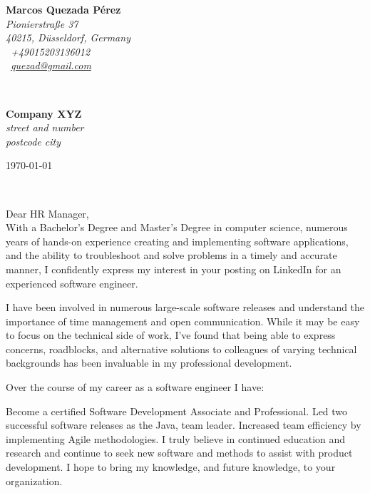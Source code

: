 \documentclass[a4paper,nonstopmode,11pt]{article}
\renewcommand{\sffamily}{\rmfamily}
\begin{document}
\sffamily   %
\hfill%
\begin{minipage}[t]{.6\textwidth}
\raggedleft%
{\bfseries Marcos Quezada Pérez}\\[.35ex]
\small\itshape%
Pionierstraße 37\\
40215, Düsseldorf, Germany\\[.35ex]
\Telefon~+49015203136012\\
\Letter~\href{mailto:quezad@gmail.com}{quezad@gmail.com}
\end{minipage}\\[1em]
%
\begin{minipage}[t]{.4\textwidth}
\raggedright%
{\bfseries Company XYZ}\\[.35ex]
\small\itshape%
street and number\\
postcode city
\end{minipage}
\hfill %
\begin{minipage}[t]{.4\textwidth}
\raggedleft %
\today
\end{minipage}\\[2em]
\raggedright
Dear HR Manager,\\[1.5em]
%
With a Bachelor’s Degree and Master’s Degree in computer science, numerous years of hands-on experience creating and implementing software applications, and the ability to troubleshoot and solve problems in a timely and accurate manner, I confidently express my interest in your posting on LinkedIn for an experienced software engineer.

I have been involved in numerous large-scale software releases and understand the importance of time management and open communication. While it may be easy to focus on the technical side of work, I’ve found that being able to express concerns, roadblocks, and alternative solutions to colleagues of varying technical backgrounds has been invaluable in my professional development.

Over the course of my career as a software engineer I have:

Become a certified Software Development Associate and Professional.
Led two successful software releases as the Java, team leader.
Increased team efficiency by implementing Agile methodologies.
I truly believe in continued education and research and continue to seek new software and methods to assist with product development. I hope to bring my knowledge, and future knowledge, to your organization.
\end{document}
